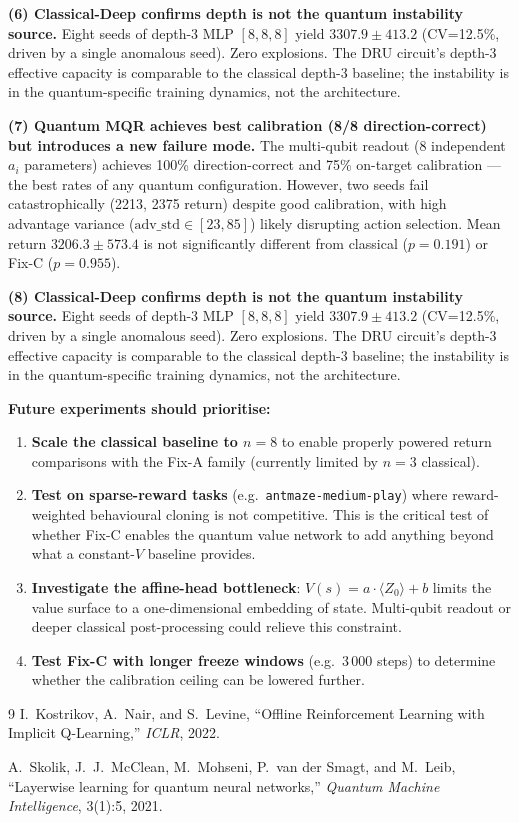 \documentclass[10pt,a4paper]{article}
\begin{document}
\textbf{(6) Classical-Deep confirms depth is not the quantum instability source.}
Eight seeds of depth-3 MLP $[8,8,8]$ yield $3307.9\pm413.2$ (CV=12.5\%, driven
by a single anomalous seed). Zero explosions. The DRU circuit's depth-3
effective capacity is comparable to the classical depth-3 baseline; the
instability is in the quantum-specific training dynamics, not the architecture.

\textbf{(7) Quantum MQR achieves best calibration (8/8 direction-correct) but
introduces a new failure mode.}
The multi-qubit readout (8 independent $a_i$ parameters) achieves 100\%
direction-correct and 75\% on-target calibration — the best rates of any quantum
configuration. However, two seeds fail catastrophically (2213, 2375 return) despite
good calibration, with high advantage variance ($\text{adv\_std}\in[23,85]$) likely
disrupting action selection. Mean return $3206.3 \pm 573.4$ is not significantly
different from classical ($p=0.191$) or Fix-C ($p=0.955$).

\textbf{(8) Classical-Deep confirms depth is not the quantum instability source.}
Eight seeds of depth-3 MLP $[8,8,8]$ yield $3307.9\pm413.2$ (CV=12.5\%, driven
by a single anomalous seed). Zero explosions. The DRU circuit's depth-3
effective capacity is comparable to the classical depth-3 baseline; the
instability is in the quantum-specific training dynamics, not the architecture.

\textbf{Future experiments should prioritise:}
\begin{enumerate}
  \item \textbf{Scale the classical baseline to $n=8$} to enable properly
        powered return comparisons with the Fix-A family (currently limited by
        $n=3$ classical).
  \item \textbf{Test on sparse-reward tasks} (e.g.\ \texttt{antmaze-medium-play})
        where reward-weighted behavioural cloning is not competitive. This is the
        critical test of whether Fix-C enables the quantum value network to
        add anything beyond what a constant-$V$ baseline provides.
  \item \textbf{Investigate the affine-head bottleneck}: $V(s)=a\cdot\langle Z_0\rangle+b$
        limits the value surface to a one-dimensional embedding of state. Multi-qubit
        readout or deeper classical post-processing could relieve this constraint.
  \item \textbf{Test Fix-C with longer freeze windows} (e.g.\ 3\,000 steps) to
        determine whether the calibration ceiling can be lowered further.
\end{enumerate}

\begin{thebibliography}{9}
I.~Kostrikov, A.~Nair, and S.~Levine,
``Offline Reinforcement Learning with Implicit Q-Learning,''
\textit{ICLR}, 2022.

A.~Skolik, J.~J.~McClean, M.~Mohseni, P.~van der Smagt, and M.~Leib,
``Layerwise learning for quantum neural networks,''
\textit{Quantum Machine Intelligence}, 3(1):5, 2021.
\end{thebibliography}
\end{document}
